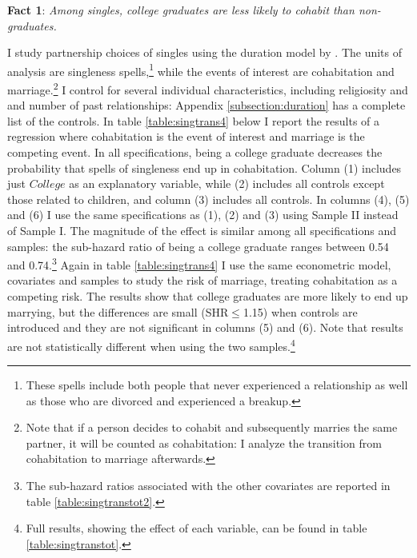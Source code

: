 \documentclass[12pt]{article}
\begin{document}
\noindent\textbf{Fact 1}:\textit{ Among singles, college graduates are less likely to cohabit than non-graduates.}

I study partnership choices of singles using the duration model by  \citet{fine1999}. The units of analysis are singleness spells,\footnote{These spells include both people that never experienced a relationship as well as those who are divorced and experienced a breakup.} while the events of interest are cohabitation and marriage.\footnote{Note that if a person decides to cohabit and subsequently marries the same partner, it will be counted as cohabitation: I analyze the transition from cohabitation to marriage afterwards.} I control for several individual characteristics, including religiosity and and number of past relationships: Appendix \ref{subsection:duration} has a complete list of the controls.  In table \ref{table:singtrans4} below I report the results of a regression where cohabitation is the event of interest and marriage is the competing event. In all specifications, being a college graduate decreases the probability that spells of singleness end up in cohabitation. Column (1) includes just $College$ as an explanatory variable, while (2) includes all controls except those related to children, and column (3) includes all controls. In columns (4), (5) and (6) I use the same specifications as (1), (2) and (3) using Sample II instead of Sample I. The magnitude of the effect is similar among all specifications and samples: the sub-hazard ratio of being a college graduate ranges between 0.54 and 0.74.\footnote{The sub-hazard ratios associated with the other covariates are reported in table \ref{table:singtranstot2}.}
Again in table \ref{table:singtrans4} I use the same econometric model, covariates and samples to study the risk of marriage, treating cohabitation as a competing risk. The results show that college graduates are more likely to end up marrying, but the differences are small (SHR$\leq$1.15) when controls are introduced and they are not significant in columns (5) and (6). Note that results are not statistically different when using the two samples.\footnote{Full results, showing the effect of each variable, can be found in table \ref{table:singtranstot}.}
\end{document}
